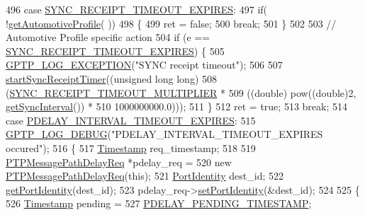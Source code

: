 \begin{DoxyCode}
496     \textcolor{keywordflow}{case} \hyperlink{ieee1588_8hpp_a5667b805d857c6d28f83f6038a0272d3ac09ed008614f57d58759e4fd5a3c9622}{SYNC\_RECEIPT\_TIMEOUT\_EXPIRES}:
497         \textcolor{keywordflow}{if}( !\hyperlink{class_common_port_ad8dc4b5a985b466538d6805970eb0176}{getAutomotiveProfile}( ))
498         \{
499             ret = \textcolor{keyword}{false};
500             \textcolor{keywordflow}{break};
501         \}
502 
503         \textcolor{comment}{// Automotive Profile specific action}
504         \textcolor{keywordflow}{if} (e == \hyperlink{ieee1588_8hpp_a5667b805d857c6d28f83f6038a0272d3ac09ed008614f57d58759e4fd5a3c9622}{SYNC\_RECEIPT\_TIMEOUT\_EXPIRES}) \{
505             \hyperlink{gptp__log_8hpp_a5c9d2f25d8d69eb2e585b35c72896357}{GPTP\_LOG\_EXCEPTION}(\textcolor{stringliteral}{"SYNC receipt timeout"});
506 
507             \hyperlink{class_common_port_a25bf37b5026e4b86b138498915330656}{startSyncReceiptTimer}((\textcolor{keywordtype}{unsigned} \textcolor{keywordtype}{long} \textcolor{keywordtype}{long})
508                           (\hyperlink{common__port_8hpp_ab8e9bce6c4f31a2db1b778fdfd63fae3}{SYNC\_RECEIPT\_TIMEOUT\_MULTIPLIER} *
509                            ((\textcolor{keywordtype}{double}) pow((\textcolor{keywordtype}{double})2, \hyperlink{class_common_port_a963da67f8dd0b8c72bd19ca91c3ce00d}{getSyncInterval}()) *
510                         1000000000.0)));
511         \}
512         ret = \textcolor{keyword}{true};
513         \textcolor{keywordflow}{break};
514     \textcolor{keywordflow}{case} \hyperlink{ieee1588_8hpp_a5667b805d857c6d28f83f6038a0272d3a4a091942df6468dd3a16b6691bc579ee}{PDELAY\_INTERVAL\_TIMEOUT\_EXPIRES}:
515         \hyperlink{gptp__log_8hpp_ae4c6efe7c9cf6d7d3bbd28a0fd087d61}{GPTP\_LOG\_DEBUG}(\textcolor{stringliteral}{"PDELAY\_INTERVAL\_TIMEOUT\_EXPIRES occured"});
516         \{
517             \hyperlink{class_timestamp}{Timestamp} req\_timestamp;
518 
519             \hyperlink{class_p_t_p_message_path_delay_req}{PTPMessagePathDelayReq} *pdelay\_req =
520                 \textcolor{keyword}{new} \hyperlink{class_p_t_p_message_path_delay_req}{PTPMessagePathDelayReq}(\textcolor{keyword}{this});
521             \hyperlink{class_port_identity}{PortIdentity} dest\_id;
522             \hyperlink{class_common_port_a563117781330d95f1c6aa43837b7e4ed}{getPortIdentity}(dest\_id);
523             pdelay\_req->\hyperlink{class_p_t_p_message_common_a94378ebb164e2095d3a17b393a63f2dc}{setPortIdentity}(&dest\_id);
524 
525             \{
526                 \hyperlink{class_timestamp}{Timestamp} pending =
527                     \hyperlink{ieee1588_8hpp_ac581f400733550b025ec8d37435f35bc}{PDELAY\_PENDING\_TIMESTAMP};

\end{DoxyCode}
